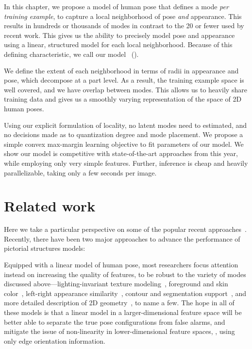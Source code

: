  In this chapter, we propose a model of human pose that 
defines a mode {\em per training example}, to capture a local neighborhood of
pose {\em and } appearance.  This results in hundreds or thousands of modes in 
contrast to the 20 or fewer used by recent work. This gives us the ability to 
precisely model pose and appearance using a linear, structured model for each 
local neighborhood.  Because of this defining characteristic, we call our model 
\LLPSlong~(\LLPS).

We define the extent of each neighborhood in terms of radii in appearance and 
pose, which decompose at a part level.  As a result, the training example space 
is well covered, and we have overlap between modes.  This allows us to heavily 
share training data and gives us a smoothly varying representation of the space 
of 2D human poses.

Using our explicit formulation of locality, no latent modes need to estimated, 
and no decisions made as to quantization degree and mode placement.  We propose 
a simple convex max-margin learning objective to fit parameters of our model.  
We show our model is competitive with state-of-the-art approaches from this 
year, while employing only very simple features. Further, inference is cheap 
and heavily parallelizable, taking only a few seconds per image.


\section{Related work}
Here we take a particular perspective on some of the popular recent 
approaches~\citet{devacrf,eichner09,sapp2010cascades,sapp2011,andriluka09,ddtran}.  
Recently, there have been two major approaches to advance the performance of 
pictorial structures models:

  Equipped with a linear model of 
human pose, most researchers focus attention instead on increasing the quality 
of features, to be robust to the variety of modes discussed 
above---lighting-invariant texture modeling~\citep{andriluka09}, foreground and 
skin color~\citep{devacrf,eichner09}, left-right appearance 
similarity~\citep{ddtran,sapp2011}, contour and segmentation 
support~\citep{sapp2010cascades,sapp2011}, and more detailed description of 2D 
geometry~\citep{ddtran,sapp2011}, to name a few.  The hope in all of these 
models is that a linear model in a larger-dimensional feature space will be 
better able to separate the true pose configurations from false alarms, and 
mitigate the issue of non-linearity in lower-dimensional feature spaces, \eg, 
using only edge orientation information.

